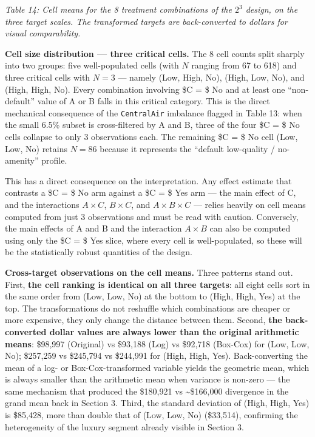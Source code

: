 \emph{Table 14: Cell means for the 8 treatment combinations of the
\(2^3\) design, on the three target scales. The transformed targets are
back-converted to dollars for visual comparability.}

\textbf{Cell size distribution --- three critical cells.} The 8 cell
counts split sharply into two groups: five well-populated cells (with
\(N\) ranging from 67 to 618) and three critical cells with \(N = 3\)
--- namely (Low, High, No), (High, Low, No), and (High, High, No). Every
combination involving \$C = \$ No and at least one ``non-default'' value
of A or B falls in this critical category. This is the direct mechanical
consequence of the \texttt{CentralAir} imbalance flagged in Table 13:
when the small 6.5\% subset is cross-filtered by A and B, three of the
four \$C = \$ No cells collapse to only 3 observations each. The
remaining \$C = \$ No cell (Low, Low, No) retains \(N = 86\) because it
represents the ``default low-quality / no-amenity'' profile.

This has a direct consequence on the interpretation. Any effect estimate
that contrasts a \$C = \$ No arm against a \$C = \$ Yes arm --- the main
effect of C, and the interactions \(A \times C\), \(B \times C\), and
\(A \times B \times C\) --- relies heavily on cell means computed from
just 3 observations and must be read with caution. Conversely, the main
effects of A and B and the interaction \(A \times B\) can also be
computed using only the \$C = \$ Yes slice, where every cell is
well-populated, so these will be the statistically robust quantities of
the design.

\textbf{Cross-target observations on the cell means.} Three patterns
stand out. First, \textbf{the cell ranking is identical on all three
targets}: all eight cells sort in the same order from (Low, Low, No) at
the bottom to (High, High, Yes) at the top. The transformations do not
reshuffle which combinations are cheaper or more expensive, they only
change the distance between them. Second, \textbf{the back-converted
dollar values are always lower than the original arithmetic means}:
\$98,997 (Original) vs \$93,188 (Log) vs \$92,718 (Box-Cox) for (Low,
Low, No); \$257,259 vs \$245,794 vs \$244,991 for (High, High, Yes).
Back-converting the mean of a log- or Box-Cox-transformed variable
yields the geometric mean, which is always smaller than the arithmetic
mean when variance is non-zero --- the same mechanism that produced the
\$180,921 vs \textasciitilde\$166,000 divergence in the grand mean back
in Section 3. Third, the standard deviation of (High, High, Yes) is
\$85,428, more than double that of (Low, Low, No) (\$33,514), confirming
the heterogeneity of the luxury segment already visible in Section 3.

